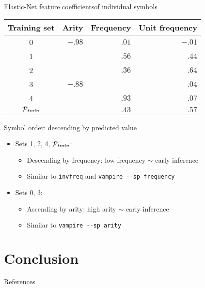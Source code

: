 \documentclass[notes]{beamer}
\begin{document}
\begin{frame}{Elastic-Net feature coefficients}{of individual symbols}

\begin{table}
\begin{tabular}{c|rrr}
	Training set & Arity & Frequency & Unit frequency \\
	\hline
	0 & $-.98$ & $ .01$ & $-.01$ \\
	1 &        & $ .56$ & $ .44$ \\
	2 &        & $ .36$ & $ .64$ \\
	3 & $-.88$ &        & $ .04$ \\
	4 &        & $ .93$ & $ .07$ \\
	\hline
	\(\mathcal{P}_{\mathit{train}}\) &        & $ .43$ & $ .57$ \\
\end{tabular}
\end{table}

Symbol order: descending by predicted value

\begin{itemize}
	\item Sets 1, 2, 4, $\mathcal{P}_{\mathit{train}}$:
	\begin{itemize}
		\item Descending by frequency: low frequency $\sim$ early inference
		\item Similar to \texttt{invfreq} and \texttt{vampire \--\--sp frequency}
	\end{itemize}
	\item Sets 0, 3:
	\begin{itemize}
		\item Ascending by arity: high arity $\sim$ early inference
		\item Similar to \texttt{vampire \--\--sp arity}
	\end{itemize}
\end{itemize}

\end{frame}

\section{Conclusion}

\begin{frame}{References}


\end{frame}
\end{document}
